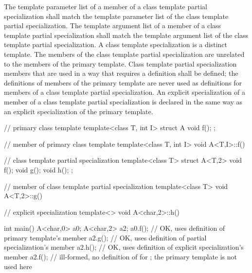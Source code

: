 \pnum
The template parameter list of a member of a class template partial
specialization shall match the template parameter list of the class template
partial specialization.
The template argument list of a member of a class template partial
specialization shall match the template argument list of the class template
partial specialization.
A class template specialization is a distinct template.
The members of the class template partial specialization are
unrelated to the members of the primary template.
Class template partial specialization members that are used in a way that
requires a definition shall be defined; the definitions of members of the
primary template are never used as definitions for members of a class
template partial specialization.
An explicit specialization of a member of a class template partial
specialization is declared in the same way as an explicit specialization of
the primary template.
\begin{example}

\begin{codeblock}
// primary class template
template<class T, int I> struct A {
  void f();
};

// member of primary class template
template<class T, int I> void A<T,I>::f() { }

// class template partial specialization
template<class T> struct A<T,2> {
  void f();
  void g();
  void h();
};

// member of class template partial specialization
template<class T> void A<T,2>::g() { }

// explicit specialization
template<> void A<char,2>::h() { }

int main() {
  A<char,0> a0;
  A<char,2> a2;
  a0.f();           // OK, uses definition of primary template's member
  a2.g();           // OK, uses definition of partial specialization's member
  a2.h();           // OK, uses definition of explicit specialization's member
  a2.f();           // ill-formed, no definition of  for ; the primary template is not used here
}
\end{codeblock}
\end{example}

